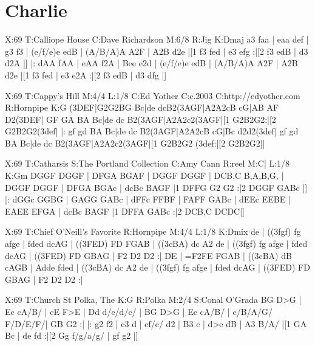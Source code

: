 \documentclass{article}
\begin{document}
\section{Charlie}

\begin{abc}[name]
X:69
T:Calliope House
C:Dave Richardson
M:6/8
R:Jig
K:Dmaj
a3 faa | eaa def | g3 f3 | (e/f/e)e edB |
(A/B/A)A A2F | A2B d2e |[1 f3 fed | e3 efg :|[2 f3 edB | d3 d2A |]
|: dAA fAA | eAA f2A | Bee e2d | (e/f/e)e edB | (A/B/A)A A2F |
A2B d2e |[1 f3 fed | e3 e2A :|[2 f3 edB | d3 dfg |]
\end{abc}

\begin{abc}[name]
X:69
T:Cappy's Hill
M:4/4
L:1/8
C:Ed Yother
C:c.2003
C:http://edyother.com
R:Hornpipe
K:G
(3DEF|G2G2BG Bc|de dcB2(3AGF|A2A2cB cG|AB AF D2(3DEF|
GF GA BA Bc|de dc B2(3AGF|A2A2c2(3AGF|[1 G2B2G2:|[2 G2B2G2(3def|
|: gf gd BA Bc|de dc B2(3AGF|A2A2cB cG|Bc d2d2(3def|
gf gd BA Bc|de dc B2(3AGF|A2A2c2(3AGF|[1 G2B2G2 (3def:|[2 G2B2G2||
\end{abc}

\begin{abc}[name]
X:69
T:Catharsis
S:The Portland Collection
C:Amy Cann
R:reel
M:C|
L:1/8
K:Gm
DGGF DGGF | DFGA BGAF | DGGF DGGF | DCB,C B,A,B,G, |
DGGF DGGF | DFGA BGAc | dcBc BAGF |1 DFFG G2 G2 :|2 DGGF GABc |]
|: dGGc GGBG | GAGG GABc | dFFc FFBF | FAFF GABc |
dEEc EEBE | EAEE EFGA | dcBc BAGF |1 DFFA GABc :|2 DCB,C DCDC|]
\end{abc}

\begin{abc}[name]
X:69
T:Chief O'Neill's Favorite
R:Hornpipe
M:4/4
L:1/8
K:Dmix
de | ((3fgf) fg afge | fded dcAG | ((3FED) FD FGAB | ((3cBA) dc A2 de |
((3fgf) fg afge | fded dcAG | ((3FED) FD GBAG | F2 D2 D2 :|
DE | =F2FE FGAB | ((3cBA) dB cAGB | Adde fded | ((3cBA) dc A2 de |
((3fgf) fg afge | fded dcAG | ((3FED) FD GBAG | F2 D2 D2 :|
\end{abc}

\begin{abc}[name]
X:69
T:Church St Polka, The
K:G
R:Polka
M:2/4
S:Conal O'Grada
BG D>G | Ec cA/B/ | cE F>E | Dd d/e/d/c/ |
BG D>G | Ec cA/B/ | c/B/A/G/ F/D/E/F/| GB G2 :|
|: g2 f2 | c3 d | ef/e/ d2 | B3 c |
d>e dB | A3 B/A/ |[1 GA Bc | de fd :|[2 Gg f/g/a/g/ | gf g2 |]
\end{abc}
\end{document}
